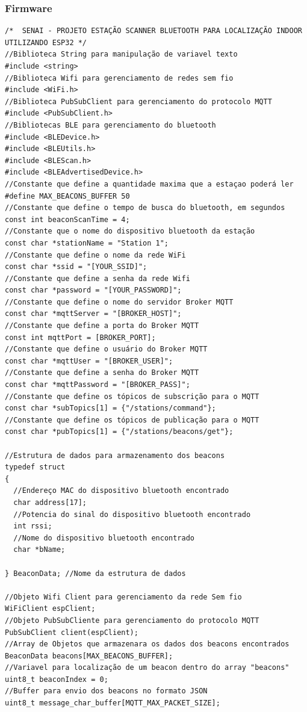 \documentclass[
	article,			%
	12pt,				%
	oneside,			%
	a4paper,			%
	english,			%
	brazil,				%
	sumario=tradicional
	]{abntex2}
\begin{document}
\subsubsection{Firmware}
	\begin{lstlisting}[style=myArduino]
/*  SENAI - PROJETO ESTAÇÃO SCANNER BLUETOOTH PARA LOCALIZAÇÃO INDOOR UTILIZANDO ESP32 */
//Biblioteca String para manipulação de variavel texto
#include <string>
//Biblioteca Wifi para gerenciamento de redes sem fio
#include <WiFi.h>
//Biblioteca PubSubClient para gerenciamento do protocolo MQTT
#include <PubSubClient.h>
//Bibliotecas BLE para gerenciamento do bluetooth
#include <BLEDevice.h>
#include <BLEUtils.h>
#include <BLEScan.h>
#include <BLEAdvertisedDevice.h>
//Constante que define a quantidade maxima que a estaçao poderá ler
#define MAX_BEACONS_BUFFER 50
//Constante que define o tempo de busca do bluetooth, em segundos
const int beaconScanTime = 4;
//Constante que o nome do dispositivo bluetooth da estação
const char *stationName = "Station 1";
//Constante que define o nome da rede WiFi
const char *ssid = "[YOUR_SSID]";
//Constante que define a senha da rede Wifi
const char *password = "[YOUR_PASSWORD]";
//Constante que define o nome do servidor Broker MQTT
const char *mqttServer = "[BROKER_HOST]";
//Constante que define a porta do Broker MQTT
const int mqttPort = [BROKER_PORT];
//Constante que define o usuário do Broker MQTT
const char *mqttUser = "[BROKER_USER]";
//Constante que define a senha do Broker MQTT
const char *mqttPassword = "[BROKER_PASS]";
//Constante que define os tópicos de subscrição para o MQTT
const char *subTopics[1] = {"/stations/command"};
//Constante que define os tópicos de publicação para o MQTT
const char *pubTopics[1] = {"/stations/beacons/get"};

//Estrutura de dados para armazenamento dos beacons
typedef struct
{
  //Endereço MAC do dispositivo bluetooth encontrado
  char address[17];
  //Potencia do sinal do dispositivo bluetooth encontrado
  int rssi;
  //Nome do dispositivo bluetooth encontrado
  char *bName;

} BeaconData; //Nome da estrutura de dados

//Objeto Wifi Client para gerenciamento da rede Sem fio
WiFiClient espClient;
//Objeto PubSubCliente para gerenciamento do protocolo MQTT
PubSubClient client(espClient);
//Array de Objetos que armazenara os dados dos beacons encontrados 
BeaconData beacons[MAX_BEACONS_BUFFER];
//Variavel para localização de um beacon dentro do array "beacons"
uint8_t beaconIndex = 0;
//Buffer para envio dos beacons no formato JSON
uint8_t message_char_buffer[MQTT_MAX_PACKET_SIZE];


\end{lstlisting}
\end{document}
